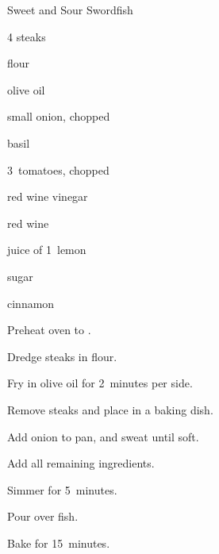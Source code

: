 \begin{recipe}{Sweet and Sour Swordfish}{}{}

\begin{ingredients}
\item 4   steaks
\item flour
\item {} olive oil
\item small onion, chopped
\item {} basil
\item 3~tomatoes, chopped
\item {} red wine vinegar
\item {} red wine
\item juice of 1~lemon
\item {} sugar
\item {} cinnamon
\end{ingredients}

\begin{directions}
\item Preheat oven to .
\item Dredge steaks in flour.
\item Fry in olive oil for 2~minutes per side.
\item Remove steaks and place in a baking dish.
\item Add onion to pan, and sweat until soft.
\item Add all remaining ingredients.
\item Simmer for 5~minutes.
\item Pour over fish.
\item Bake for 15~minutes.
\end{directions}

\end{recipe}
